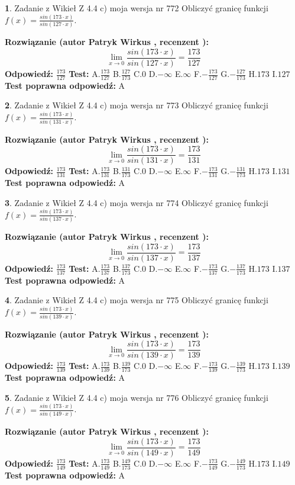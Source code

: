 \documentclass[12pt, a4paper]{article}
\theoremstyle{definition} %
\newtheorem{zad}{}
\newcommand{\zadStart}[1]{\begin{zad}#1\newline}
\newcommand{\zadStop}{\end{zad}}
\newcommand{\rozwStart}[2]{\noindent \textbf{Rozwiązanie (autor #1 , recenzent #2): }\newline}
\newcommand{\rozwStop}{\newline}
\newcommand{\odpStart}{\noindent \textbf{Odpowiedź:}\newline}
\newcommand{\odpStop}{\newline}
\newcommand{\testStart}{\noindent \textbf{Test:}\newline}
\newcommand{\testStop}{\newline}
\newcommand{\kluczStart}{\noindent \textbf{Test poprawna odpowiedź:}\newline}
\newcommand{\kluczStop}{\newline}
\begin{document}
\zadStart{Zadanie z Wikieł Z 4.4 c) moja wersja nr 772}
Obliczyć granicę funkcji $f(x)=\frac{sin(173\cdot x)}{sin(127\cdot x)}$.
\zadStop
\rozwStart{Patryk Wirkus}{}
$$\lim\limits_{x\to 0}\frac{sin(173\cdot x)}{sin(127\cdot x)}=
\frac{173}{127}$$
\rozwStop
\odpStart
$\frac{173}{127}$
\odpStop
\testStart
A.$\frac{173}{127}$
B.$\frac{127}{173}$
C.$0$
D.$-\infty$
E.$\infty$
F.$-\frac{173}{127}$
G.$-\frac{127}{173}$
H.$173$
I.$127$
\testStop
\kluczStart
A
\kluczStop



\zadStart{Zadanie z Wikieł Z 4.4 c) moja wersja nr 773}
Obliczyć granicę funkcji $f(x)=\frac{sin(173\cdot x)}{sin(131\cdot x)}$.
\zadStop
\rozwStart{Patryk Wirkus}{}
$$\lim\limits_{x\to 0}\frac{sin(173\cdot x)}{sin(131\cdot x)}=
\frac{173}{131}$$
\rozwStop
\odpStart
$\frac{173}{131}$
\odpStop
\testStart
A.$\frac{173}{131}$
B.$\frac{131}{173}$
C.$0$
D.$-\infty$
E.$\infty$
F.$-\frac{173}{131}$
G.$-\frac{131}{173}$
H.$173$
I.$131$
\testStop
\kluczStart
A
\kluczStop



\zadStart{Zadanie z Wikieł Z 4.4 c) moja wersja nr 774}
Obliczyć granicę funkcji $f(x)=\frac{sin(173\cdot x)}{sin(137\cdot x)}$.
\zadStop
\rozwStart{Patryk Wirkus}{}
$$\lim\limits_{x\to 0}\frac{sin(173\cdot x)}{sin(137\cdot x)}=
\frac{173}{137}$$
\rozwStop
\odpStart
$\frac{173}{137}$
\odpStop
\testStart
A.$\frac{173}{137}$
B.$\frac{137}{173}$
C.$0$
D.$-\infty$
E.$\infty$
F.$-\frac{173}{137}$
G.$-\frac{137}{173}$
H.$173$
I.$137$
\testStop
\kluczStart
A
\kluczStop



\zadStart{Zadanie z Wikieł Z 4.4 c) moja wersja nr 775}
Obliczyć granicę funkcji $f(x)=\frac{sin(173\cdot x)}{sin(139\cdot x)}$.
\zadStop
\rozwStart{Patryk Wirkus}{}
$$\lim\limits_{x\to 0}\frac{sin(173\cdot x)}{sin(139\cdot x)}=
\frac{173}{139}$$
\rozwStop
\odpStart
$\frac{173}{139}$
\odpStop
\testStart
A.$\frac{173}{139}$
B.$\frac{139}{173}$
C.$0$
D.$-\infty$
E.$\infty$
F.$-\frac{173}{139}$
G.$-\frac{139}{173}$
H.$173$
I.$139$
\testStop
\kluczStart
A
\kluczStop



\zadStart{Zadanie z Wikieł Z 4.4 c) moja wersja nr 776}
Obliczyć granicę funkcji $f(x)=\frac{sin(173\cdot x)}{sin(149\cdot x)}$.
\zadStop
\rozwStart{Patryk Wirkus}{}
$$\lim\limits_{x\to 0}\frac{sin(173\cdot x)}{sin(149\cdot x)}=
\frac{173}{149}$$
\rozwStop
\odpStart
$\frac{173}{149}$
\odpStop
\testStart
A.$\frac{173}{149}$
B.$\frac{149}{173}$
C.$0$
D.$-\infty$
E.$\infty$
F.$-\frac{173}{149}$
G.$-\frac{149}{173}$
H.$173$
I.$149$
\testStop
\kluczStart
A
\kluczStop
\end{document}
